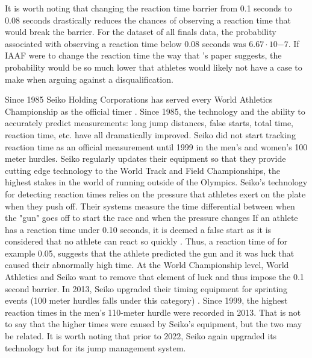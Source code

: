 \documentclass[12pt, letterpaper, titlepage]{article}
\begin{document}
It is worth noting that changing the reaction time barrier from 0.1 seconds to
0.08 seconds drastically reduces the chances of observing a reaction time that
would break the barrier.  For the dataset of all finals data, the probability
associated with observing a reaction time below 0.08 seconds was $6.67\cdot10{-7}$.
If IAAF were to change the reaction time the way that \citet{Komi}'s paper
suggests, the probability would be so much lower that athletes would likely not
have a case to make when arguing against a disqualification.


Since 1985 Seiko Holding Corporations has served every World Athletics Championship
as the official timer \citep{Seiko}.  Since 1985, the technology and the ability
to accurately predict measurements: long jump distances, false starts, total time,
reaction time, etc. have all dramatically improved.  Seiko did not start tracking
reaction time as an official measurement until 1999 in the men's and women's 100 meter
hurdles.  Seiko regularly updates their equipment so that they provide cutting edge
technology to the World Track and Field Championships, the highest stakes in the world
of running outside of the Olympics. Seiko's technology for detecting reaction 
times relies on the pressure that athletes
exert on the plate when they push off.  Their systems measure the time differential
between when the "gun" goes off to start the race and when the pressure changes 
\citep{Seiko}  If an athlete has a reaction time under 0.10 seconds, it is deemed a 
false start as it is considered that no athlete can react so quickly 
\citep{Seiko-Timing}.  Thus, a reaction time of for example 0.05, suggests that 
the athlete predicted the gun and it was luck that caused their abnormally high 
time.  At the World Championship level, World Athletics and Seiko want to remove 
that element of luck and thus impose the 0.1 second barrier. In 2013, Seiko 
upgraded their timing equipment for sprinting events (100 meter hurdles falls 
under this category) \citep{WorldAthletics_2013}.  Since 1999, the highest reaction 
times in the men's 110-meter hurdle were recorded in 2013.  That is not to say that the higher 
times were caused by Seiko's equipment, but the two may be related.  It is worth noting that prior
to 2022, Seiko again upgraded its technology but for its jump management system.
\end{document}
